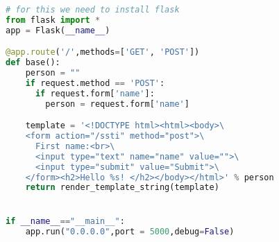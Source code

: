 \documentclass[./../main.tex]{subfiles}
\begin{document}
\begin{lstlisting}[language=python, caption=Lỗ hổng Server-side Template Injection,  label={src:ssti}]
# for this we need to install flask
from flask import *
app = Flask(__name__)

@app.route('/',methods=['GET', 'POST'])
def base():
    person = ""
    if request.method == 'POST':
      if request.form['name']:
        person = request.form['name']

    template = '<!DOCTYPE html><html><body>\
    <form action="/ssti" method="post">\
      First name:<br>\
      <input type="text" name="name" value="">\
      <input type="submit" value="Submit">\
    </form><h2>Hello %s! </h2></body></html>' % person
    return render_template_string(template)


if __name__=="__main__":
	app.run("0.0.0.0",port = 5000,debug=False)

\end{lstlisting}
\end{document}
